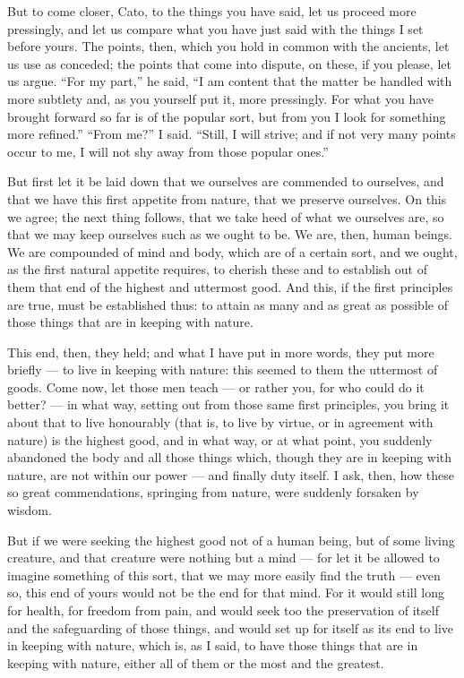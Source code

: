  But to come closer, Cato, to the things you have said, let us proceed more pressingly, and let us compare what you have just said with the things I set before yours. The points, then, which you hold in common with the ancients, let us use as conceded; the points that come into dispute, on these, if you please, let us argue. ``For my part,'' he said, ``I am content that the matter be handled with more subtlety and, as you yourself put it, more pressingly. For what you have brought forward so far is of the popular sort, but from you I look for something more refined.'' ``From me?'' I said. ``Still, I will strive; and if not very many points occur to me, I will not shy away from those popular ones.''

 But first let it be laid down that we ourselves are commended to ourselves, and that we have this first appetite from nature, that we preserve ourselves. On this we agree; the next thing follows, that we take heed of what we ourselves are, so that we may keep ourselves such as we ought to be. We are, then, human beings. We are compounded of mind and body, which are of a certain sort, and we ought, as the first natural appetite requires, to cherish these and to establish out of them that end of the highest and uttermost good. And this, if the first principles are true, must be established thus: to attain as many and as great as possible of those things that are in keeping with nature.

 This end, then, they held; and what I have put in more words, they put more briefly — to live in keeping with nature: this seemed to them the uttermost of goods. Come now, let those men teach — or rather you, for who could do it better? — in what way, setting out from those same first principles, you bring it about that to live honourably (that is, to live by virtue, or in agreement with nature) is the highest good, and in what way, or at what point, you suddenly abandoned the body and all those things which, though they are in keeping with nature, are not within our power — and finally duty itself. I ask, then, how these so great commendations, springing from nature, were suddenly forsaken by wisdom.

 But if we were seeking the highest good not of a human being, but of some living creature, and that creature were nothing but a mind — for let it be allowed to imagine something of this sort, that we may more easily find the truth — even so, this end of yours would not be the end for that mind. For it would still long for health, for freedom from pain, and would seek too the preservation of itself and the safeguarding of those things, and would set up for itself as its end to live in keeping with nature, which is, as I said, to have those things that are in keeping with nature, either all of them or the most and the greatest.

